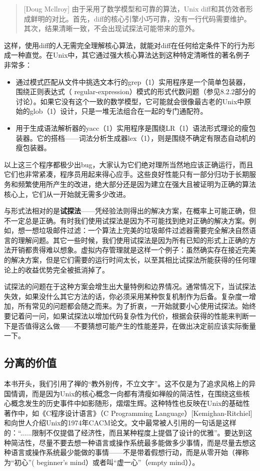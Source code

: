 \documentclass[11pt,oneside]{book}
\begin{document}
\begin{common-format}
\begin{quote}[Doug Mcllroy]
由于采用了数学模型和可靠的算法，Unix diff和其仿效者形成鲜明的对比。首先，diff的核心引擎小巧可靠，没有一行代码需要维护。其次，结果清晰一致，不会出现试探法可能带来的意外。
\end{quote}

这样，使用diff的人无需完全理解核心算法，就能对diff在任何给定条件下的行为形成一种直觉。在Unix中，其它通过强大核心算法达到这种特定清晰性的著名例子非常多：

\begin{itemize}
\item 通过模式匹配从文件中挑选文本行的grep（1）实用程序是一个简单包装器，围绕正则表达式（ regular-expression）模式的形式代数问题（参见8.2.2部分的讨论）。如果它没有这个一致的数学模型，它可能就会很像最古老的Unix中原始的glob（1）设计，只是一堆无法组合在一起的专门通配符。
\item 用于生成语法解析器的yacc（1）实用程序是围绕LR（1）语法形式理论的瘦包装器。它的搭档——词法分析生成器lex（1），则是围绕不确定有限态自动机的瘦包装器。
\end{itemize}

以上这三个程序都极少出bug，大家认为它们绝对理所当然地应该正确运行，而且它们也非常紧凑，程序员用起来得心应手。这些良好性能只有一部分归功于长期服务和频繁使用所产生的改进，绝大部分还是因为建立在强大且被证明为正确的算法核心上，它们从一开始就无需多少改进。

与形式法相对的是\textbf{试探法}——凭经验法则得出的解决方案，在概率上可能正确，但不一定总是正确。有时我们使用试探法是因为不可能找到绝对正确的解决方案。例如，想一想垃圾邮件过滤：一个算法上完美的垃圾邮件过滤器需要完全解决自然语言的理解问题。其它一些时候，我们使用试探法是因为所有已知的形式上正确的方法开销都贵得难以想象。虚拟内存管理就是这样一个例子：虽然确实存在接近完美的解决方案，但是它们需要的运行时间太长，以至其相比试探法所能获得的任何理论上的收益优势完全被抵消掉了。

试探法的问题在于这种方案会增生出大量特例和边界情况。通常情况下，当试探法失效，如果没什么其它方法的话，你必须采用某种恢复机制作为后备。复杂度一增加，所有常见的问题都会随之而来。为了折衷，一开始就要小心使用试探法。始终要记着问一问，如果试探法以增加代码复杂性为代价，根据会获得的性能来判断一下是否值得这么做——不要猜想可能产生的性能差异，在做出决定前应该实际衡量一下。

\subsection{分离的价值}
本书开头，我们引用了禅的“教外别传，不立文字”。这不仅是为了追求风格上的异国情调，而是因为Unix的核心概念一向都有清瘦如禅般的简洁性，在围绕这些核心概念发生的历史事件中如影随形，熠熠生辉。这种特性也反映在Unix的基础性著作中，如《C程序设计语言》（C Programming Language）[Kemighan-Ritchiel]和向世人介绍Unix的1974年CACM论文。文中最常被人引用的一句话是这样的：“......限制不仅提倡了经济性，而且某种程度上提倡了设计的优雅”。要达到这种简洁性，尽量不要去想一种语言或操作系统最多能做多少事情，而是尽量去想这种语言或操作系统最少能做的事情——不是带着假想行动，而是从零开始（禅称为“初心”( beginner's mind）或者叫“虚一心”（empty mind））。


\end{common-format}
\end{document}
